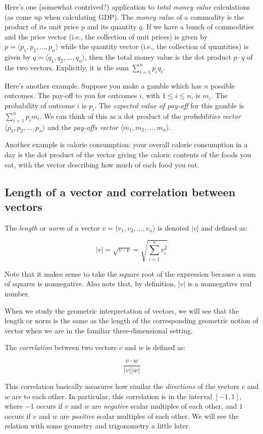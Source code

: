 \documentclass[10pt]{amsart}
\begin{document}
Here's one (somewhat contrived?) application to {\em total money
value} calculations (as come up when calculating GDP). The {\em money
value} of a commodity is the product of its unit price $p$ and its
quantity $q$. If we have a bunch of commodities and the price vector
(i.e., the collection of unit prices) is given by $p = \langle
p_1,p_2, \dots, p_n \rangle$ while the quantity vector (i.e., the
collection of quantities) is given by $q = \langle q_1,q_2,\dots,q_n
\rangle$, then the total money value is the dot product $p \cdot q$ of
the two vectors. Explicitly, it is the sum $\sum_{i=1}^n p_iq_i$.

Here's another example. Suppose you make a gamble which has $n$
possible outcomes. The pay-off to you for outcomes $i$, with $1 \le i
\le n$, is $m_i$. The probability of outcome $i$ is $p_i$. The {\em
expected value of pay-off} for this gamble is $\sum_{i=1}^n
p_im_i$. We can think of this as a dot product of the {\em
probabilities vector} $\langle p_1, p_2, \dots, p_n \rangle$ and the
{\em pay-offs vector} $\langle m_1, m_2, \dots, m_n \rangle$.

Another example is calorie consumption: your overall calorie
consumption in a day is the dot product of the vector giving the
caloric contents of the foods you eat, with the vector describing how
much of each food you eat.

\subsection{Length of a vector and correlation between vectors}

The {\em length} or {\em norm} of a vector $v = \langle v_1, v_2,
\dots, v_n \rangle$ is denoted $|v|$ and defined as:

$$|v| = \sqrt{v \cdot v} = \sqrt{\sum_{i=1}^n v_i^2}$$

Note that it makes sense to take the square root of the expression
because a sum of squares is nonnegative. Also note that, by
definition, $|v|$ is a nonnegative real number.

When we study the geometric interpretation of vectors, we will see
that the length or norm is the same as the length of the corresponding
geometric notion of vector when we are in the familiar
three-dimensional setting.

The {\em correlation} between two vectors $v$ and $w$ is defined as:

$$\frac{v \cdot w}{|v||w|}$$

This correlation basically measures how similar the {\em directions}
of the vectors $v$ and $w$ are to each other. In particular, this
correlation is in the interval $[-1,1]$, where $-1$ occurs if $v$ and
$w$ are {\em negative} scalar multiples of each other, and $1$ occurs
if $v$ and $w$ are {\em positive} scalar multiples of each other. We
will see the relation with some geometry and trigonometry a little
later.
\end{document}
